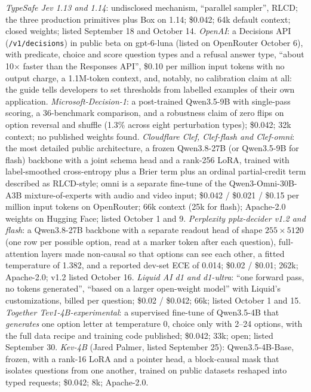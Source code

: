 \documentclass[11pt,letterpaper]{article}
\begin{document}
\emph{TypeSafe Jev 1.13 and 1.14}: undisclosed mechanism, ``parallel sampler'', RLCD; the three production primitives plus Box on 1.14; \$0.042; 64k default context; closed weights; listed September 18 and October 14. \emph{OpenAI}: a Decisions API (\texttt{/v1/decisions}) in public beta on gpt-6-luna (listed on OpenRouter October 6), with predicate, choice and score question types and a refusal answer type, ``about 10$\times$ faster than the Responses API'', \$0.10 per million input tokens with no output charge, a 1.1M-token context, and, notably, no calibration claim at all: the guide tells developers to set thresholds from labelled examples of their own application. \emph{Microsoft-Decision-1}: a post-trained Qwen3.5-9B with single-pass scoring, a 36-benchmark comparison, and a robustness claim of zero flips on option reversal and shuffle (1.3\% across eight perturbation types); \$0.042; 32k context; no published weights found. \emph{Cloudflare Clef, Clef-flash and Clef-omni}: the most detailed public architecture, a frozen Qwen3.8-27B (or Qwen3.5-9B for flash) backbone with a joint schema head and a rank-256 LoRA, trained with label-smoothed cross-entropy plus a Brier term plus an ordinal partial-credit term described as RLCD-style; omni is a separate fine-tune of the Qwen3-Omni-30B-A3B mixture-of-experts with audio and video input; \$0.042 / \$0.021 / \$0.15 per million input tokens on OpenRouter; 66k context (25k for flash); Apache-2.0 weights on Hugging Face; listed October 1 and 9. \emph{Perplexity pplx-decider v1.2 and flash}: a Qwen3.8-27B backbone with a separate readout head of shape $255\times5120$ (one row per possible option, read at a marker token after each question), full-attention layers made non-causal so that options can see each other, a fitted temperature of 1.382, and a reported dev-set ECE of 0.014; \$0.02 / \$0.01; 262k; Apache-2.0; v1.2 listed October 16. \emph{Liquid AI d1 and d1-ultra}: ``one forward pass, no tokens generated'', ``based on a larger open-weight model'' with Liquid's customizations, billed per question; \$0.02 / \$0.042; 66k; listed October 1 and 15. \emph{Together Tev1-4B-experimental}: a supervised fine-tune of Qwen3.5-4B that \emph{generates} one option letter at temperature 0, choice only with 2--24 options, with the full data recipe and training code published; \$0.042; 33k; open; listed September 30. \emph{Kev-4B} (Jared Palmer, listed September 25): Qwen3.5-4B-Base, frozen, with a rank-16 LoRA and a pointer head, a block-causal mask that isolates questions from one another, trained on public datasets reshaped into typed requests; \$0.042; 8k; Apache-2.0.
\end{document}

